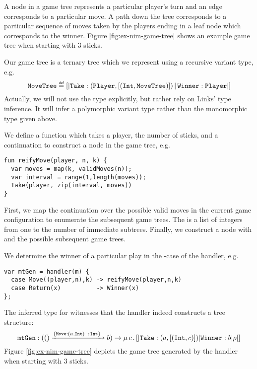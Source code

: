 \begin{example}\label{ex:nim-game-tree}
A node in a game tree represents a particular player's turn and an edge corresponds to a particular move. A path down the tree corresponds to a particular sequence of moves taken by the players ending in a leaf node which corresponds to the winner. Figure \ref{fig:ex-nim-game-tree} shows an example game tree when starting with 3 sticks.

Our game tree is a ternary tree which we represent using a recursive variant type, e.g.
\[ \type{MoveTree} \defas [|\type{Take}:(\type{Player},[(\type{Int},\type{MoveTree})])\,|\,\type{Winner}:\type{Player}|] \]
Actually, we will not use the type explicitly, but rather rely on Links' type inference. It will infer a polymorphic variant type rather than the monomorphic type given above.

We define a function  which takes a player, the number of sticks, and a continuation to construct a node in the game tree, e.g.
\begin{lstlisting}[style=links]
fun reifyMove(player, n, k) {
  var moves = map(k, validMoves(n));
  var interval = range(1,length(moves));
  Take(player, zip(interval, moves))
}
\end{lstlisting}
First, we map the continuation over the possible valid moves in the current game configuration to enumerate the subsequent game trees. The  is a list of integers from one to the number of immediate subtrees. Finally, we construct a node  with  and the possible subsequent game trees.

We determine the winner of a particular play in the -case of the handler, e.g.
\begin{lstlisting}[style=links]
var mtGen = handler(m) {
  case Move((player,n),k) -> reifyMove(player,n,k)
  case Return(x)          -> Winner(x)
};
\end{lstlisting}
The inferred type for  witnesses that the handler indeed constructs a tree structure:
\[ \code{mtGen} : (() \xrightarrow{\{\type{Move}:(a,\type{Int}) \to \type{Int}\}\;} b) \to \mu\, c\, . \, [|\type{Take}:(a, [(\type{Int}, c)])|\type{Winner}:b|\rho|] \]
Figure \ref{fig:ex-nim-game-tree} depicts the game tree generated by the handler when starting with 3 sticks.
\begin{figure}[H]
\begin{center}
\begin{tikzpicture}[level distance=1.5cm,
level 1/.style={sibling distance=3.5cm},
level 2/.style={sibling distance=2cm}]


\end{tikzpicture}
\end{center}
\end{figure}
\end{example}

